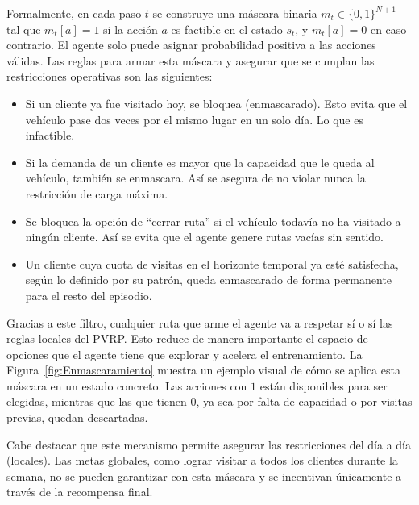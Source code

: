 Formalmente, en cada paso $t$ se construye una máscara binaria $m_{t} \in \{0,1\}^{N+1}$ tal que $m_{t}[a] = 1$ si la acción $a$ es factible en el estado $s_{t}$, y $m_{t}[a] = 0$ en caso contrario. El agente solo puede asignar probabilidad positiva a las acciones válidas. Las reglas para armar esta máscara y asegurar que se cumplan las restricciones operativas son las siguientes:

\begin{itemize}
    \item Si un cliente ya fue visitado hoy, se bloquea (enmascarado). Esto evita que el vehículo pase dos veces por el mismo lugar en un solo día. Lo que es infactible.

    \item Si la demanda de un cliente es mayor que la capacidad que le queda al vehículo, también se enmascara. Así se asegura de no violar nunca la restricción de carga máxima.

    \item Se bloquea la opción de \enquote{cerrar ruta} si el vehículo todavía no ha visitado a ningún cliente. Así se evita que el agente genere rutas vacías sin sentido.

    \item Un cliente cuya cuota de visitas en el horizonte temporal ya esté satisfecha, según lo definido por su patrón, queda enmascarado de forma permanente para el resto del episodio.
\end{itemize}

Gracias a este filtro, cualquier ruta que arme el agente va a respetar sí o sí las reglas locales del PVRP. Esto reduce de manera importante el espacio de opciones que el agente tiene que explorar y acelera el entrenamiento. La Figura~\ref{fig:Enmascaramiento} muestra un ejemplo visual de cómo se aplica esta máscara en un estado concreto. Las acciones con $1$ están disponibles para ser elegidas, mientras que las que tienen $0$, ya sea por falta de capacidad o por visitas previas, quedan descartadas.

Cabe destacar que este mecanismo permite  asegurar las restricciones del día a día (locales). Las metas globales, como lograr visitar a todos los clientes durante la semana, no se pueden garantizar con esta máscara y se incentivan únicamente a través de la recompensa final.

